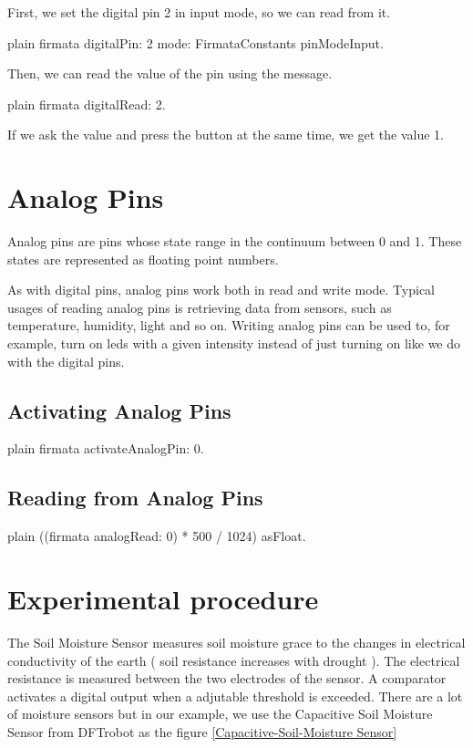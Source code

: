 \documentclass[10pt,twoside,english]{_support/latex/sbabook/sbabook}
\begin{document}
First, we set the digital pin 2 in input mode, so we can read from it.

\begin{displaycode}{plain}
  firmata digitalPin: 2 mode: FirmataConstants pinModeInput.
\end{displaycode}

Then, we can read the value of the pin using the  message.

\begin{displaycode}{plain}
  firmata digitalRead: 2.
\end{displaycode}

If we ask the value and press the button at the same time, we get the value 1.
\section{Analog Pins}
Analog pins are pins whose state range in the continuum between 0 and 1. These states are represented as floating point numbers.

As with digital pins, analog pins work both in read and write mode. 
Typical usages of reading analog pins is retrieving data from sensors, such as temperature, humidity, light and so on. 
Writing analog pins can be used to, for example, turn on leds with a given intensity instead of just turning on like we do with the digital pins.
\subsection{Activating Analog Pins}
\begin{displaycode}{plain}
  firmata activateAnalogPin: 0.
\end{displaycode}
\subsection{Reading from Analog Pins}
\begin{displaycode}{plain}
  ((firmata analogRead: 0) * 500 / 1024) asFloat.
\end{displaycode}
\section{Experimental procedure}
The Soil Moisture Sensor measures soil moisture grace to the changes in electrical conductivity of the earth ( soil resistance increases with drought ).
The electrical resistance is measured between the two electrodes of the sensor.
A comparator activates a digital output when a adjutable threshold is exceeded.
There are a lot of moisture sensors but in our example, we use the Capacitive Soil Moisture Sensor from DFTrobot as the figure \ref{Capacitive-Soil-Moisture Sensor}
\end{document}
